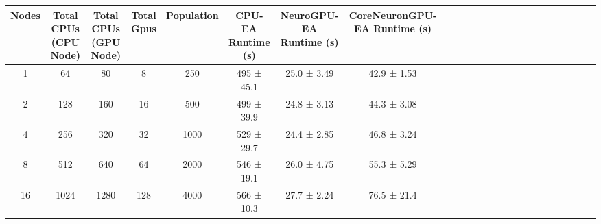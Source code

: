\begin{tabular}{|c|c|c|c|c|c|c|c|c|c|c|c|c|c|c|c|c|c|c|c|c|c|c|c|}
\toprule
 Nodes &  Total CPUs (CPU Node) &  Total CPUs (GPU Node) &  Total Gpus &  Population & CPU-EA Runtime (s) & NeuroGPU-EA Runtime (s) & CoreNeuronGPU-EA Runtime (s) \\
\midrule
     1 &                     64 &                     80 &           8 &         250 &         495 ± 45.1 &             25.0 ± 3.49 &                  42.9 ± 1.53 \\
     2 &                    128 &                    160 &          16 &         500 &         499 ± 39.9 &             24.8 ± 3.13 &                  44.3 ± 3.08 \\
     4 &                    256 &                    320 &          32 &        1000 &         529 ± 29.7 &             24.4 ± 2.85 &                  46.8 ± 3.24 \\
     8 &                    512 &                    640 &          64 &        2000 &         546 ± 19.1 &             26.0 ± 4.75 &                  55.3 ± 5.29 \\
    16 &                   1024 &                   1280 &         128 &        4000 &         566 ± 10.3 &             27.7 ± 2.24 &                  76.5 ± 21.4 \\
\bottomrule
\end{tabular}
